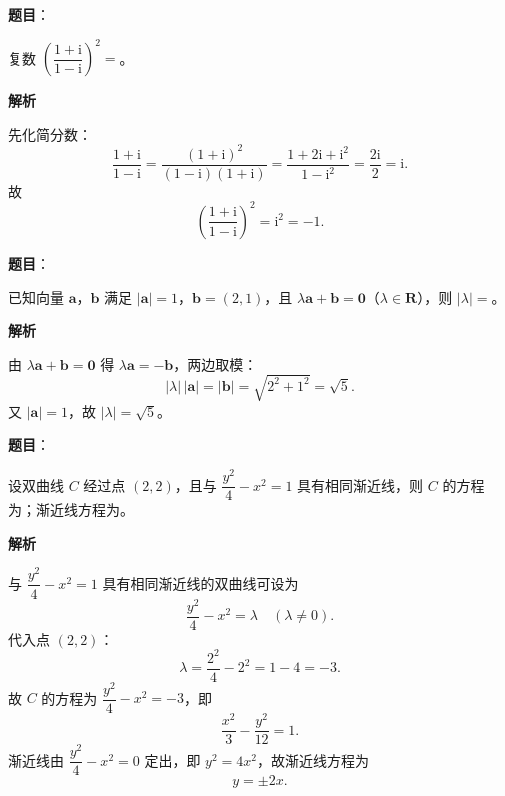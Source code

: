 \begin{answer}

\textbf{题目}：

复数 $\left(\dfrac{1+\mathrm i}{1-\mathrm i}\right)^2=$\gkblank{}。

\textbf{解析}

先化简分数：
\nopagebreak[4]
\[\frac{1+\mathrm i}{1-\mathrm i}=\frac{(1+\mathrm i)^2}{(1-\mathrm i)(1+\mathrm i)}=\frac{1+2\mathrm i+\mathrm i^2}{1-\mathrm i^2}=\frac{2\mathrm i}{2}=\mathrm i .\]
故
\nopagebreak[4]
\[\left(\frac{1+\mathrm i}{1-\mathrm i}\right)^2=\mathrm i^2=-1 .\]


\end{answer}
\begin{answer}

\textbf{题目}：

已知向量 $\boldsymbol a$，$\boldsymbol b$ 满足 $|\boldsymbol a|=1$，$\boldsymbol b=(2,1)$，且 $\lambda\boldsymbol a+\boldsymbol b=\boldsymbol 0$（$\lambda\in\mathbf R$），则 $|\lambda|=$\gkblank{}。

\textbf{解析}

由 $\lambda\boldsymbol a+\boldsymbol b=\boldsymbol 0$ 得 $\lambda\boldsymbol a=-\boldsymbol b$，两边取模：
\nopagebreak[4]
\[|\lambda|\,|\boldsymbol a|=|\boldsymbol b|=\sqrt{2^2+1^2}=\sqrt5 .\]
又 $|\boldsymbol a|=1$，故 $|\lambda|=\sqrt5$。


\end{answer}
\begin{answer}

\textbf{题目}：

设双曲线 $C$ 经过点 $(2,2)$，且与 $\dfrac{y^2}4-x^2=1$ 具有相同渐近线，则 $C$ 的方程为\gkblank{}；渐近线方程为\gkblank{}。

\textbf{解析}

与 $\dfrac{y^2}4-x^2=1$ 具有相同渐近线的双曲线可设为
\nopagebreak[4]
\[\frac{y^2}4-x^2=\lambda\quad(\lambda\neq0).\]
代入点 $(2,2)$：
\nopagebreak[4]
\[\lambda=\frac{2^2}4-2^2=1-4=-3 .\]
故 $C$ 的方程为 $\dfrac{y^2}4-x^2=-3$，即
\nopagebreak[4]
\[\frac{x^2}3-\frac{y^2}{12}=1 .\]
渐近线由 $\dfrac{y^2}4-x^2=0$ 定出，即 $y^2=4x^2$，故渐近线方程为
\nopagebreak[4]
\[y=\pm2x .\]


\end{answer}
